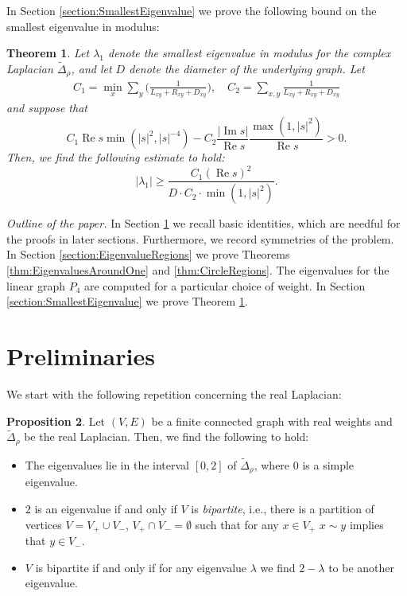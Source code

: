 \documentclass[a4paper,11pt]{amsart}
\newtheorem{theorem}{Theorem}
\theoremstyle{definition}
\newtheorem{proposition}[theorem]{Proposition}
\renewcommand{\Re}{\operatorname{Re}}%
\renewcommand{\Im}{\operatorname{Im}}%
\begin{document}
In Section \ref{section:SmallestEigenvalue} we prove the following bound on the smallest eigenvalue in modulus:
\begin{theorem}
\label{thm:Diameter}
Let $\lambda_1$ denote the smallest eigenvalue in modulus for the complex Laplacian $\widetilde \Delta_\rho$, and let $D$ denote the diameter of the underlying graph. Let
\begin{align*}
C_1 = \min_x \sum_y \big( \frac{1}{L_{xy} + R_{xy} + D_{xy}} \big), \quad C_2 = \sum_{x,y} \frac{1}{L_{xy} + R_{xy} + D_{xy}}
\end{align*}
and suppose that 
\begin{equation}
\label{eq:LowerBoundRealpart}
C_1 \Re s \min(|s|^2,|s|^{-4}) - C_2 \frac{|\Im s|}{\Re s} \frac{\max(1,|s|^2)}{\Re s} > 0.
\end{equation}
Then, we find the following estimate to hold:
\begin{equation*}
|\lambda_1| \geq \frac{C_1 (\Re s)^2}{D \cdot C_2 \cdot \min(1,|s|^2)}.
\end{equation*}
\end{theorem}

\emph{Outline of the paper.} In Section \ref{section:Preliminaries} we recall basic identities, which are needful for the proofs in later sections. Furthermore, we record symmetries of the problem. In Section \ref{section:EigenvalueRegions} we prove Theorems \ref{thm:EigenvaluesAroundOne} and \ref{thm:CircleRegions}. The eigenvalues for the linear graph $P_4$ are computed for a particular choice of weight. In Section \ref{section:SmallestEigenvalue} we prove Theorem \ref{thm:Diameter}.

\section{Preliminaries}
\label{section:Preliminaries}
We start with the following repetition concerning the real Laplacian:
\begin{proposition}
Let $(V,E)$ be a finite connected graph with real weights and $\widetilde \Delta_\rho$ be the real Laplacian. Then, we find the following to hold:
\begin{itemize}
\item[1.] The eigenvalues lie in the interval $[0,2]$ of $\widetilde \Delta_\rho$, where $0$ is a simple eigenvalue.
\item[2.] $2$ is an eigenvalue if and only if $V$ is \emph{bipartite}, i.e., there is a partition of vertices $V = V_+ \cup V_-$, $V_+ \cap V_- = \emptyset$ such that for any $x \in V_+$ $x \sim y$ implies that $y \in V_-$.
\item[3.] $V$ is bipartite if and only if for any eigenvalue $\lambda$ we find $2-\lambda$ to be another eigenvalue.
\end{itemize}
\end{proposition}
\end{document}
